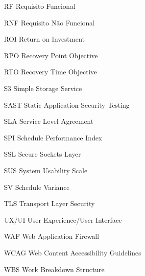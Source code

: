 \begin{siglas}
    \item[RF] Requisito Funcional
    \item[RNF] Requisito Não Funcional
    \item[ROI] Return on Investment
    \item[RPO] Recovery Point Objective
    \item[RTO] Recovery Time Objective
    \item[S3] Simple Storage Service
    \item[SAST] Static Application Security Testing
    \item[SLA] Service Level Agreement
    \item[SPI] Schedule Performance Index
    \item[SSL] Secure Sockets Layer
    \item[SUS] System Usability Scale
    \item[SV] Schedule Variance
    \item[TLS] Transport Layer Security
    \item[UX/UI] User Experience/User Interface
    \item[WAF] Web Application Firewall
    \item[WCAG] Web Content Accessibility Guidelines
    \item[WBS] Work Breakdown Structure
\end{siglas}
